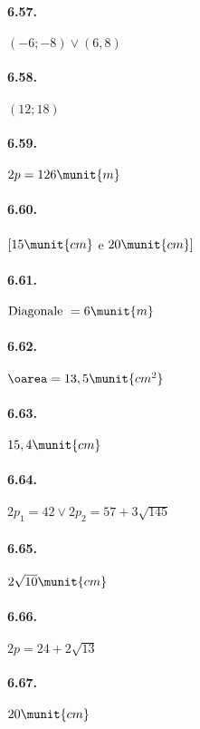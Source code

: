\begin{htmulticols}{2}
\paragraph{6.57.} \((-6;-8)\vee (6,8)\)

\paragraph{6.58.} \((12;18)\)

\paragraph{6.59.} \(2p=126\munit{m}\)

\paragraph{6.60.} \([15\munit{cm}\) e \(20\munit{cm}]\)

\paragraph{6.61.} \(\text{Diagonale }=6\munit{m}\)

\paragraph{6.62.} \(\oarea=13,5\munit{{cm}^2}\)

\paragraph{6.63.} \(15,4\munit{cm}\)

\paragraph{6.64.} \(2p_1=42\vee 2p_2=57+3\sqrt{145}\)

\paragraph{6.65.} \(2\sqrt{10}\munit{cm}\)

\paragraph{6.66.} \(2p=24+2\sqrt{13}\)

\paragraph{6.67.} \(20\munit{cm}\)


\end{htmulticols}
